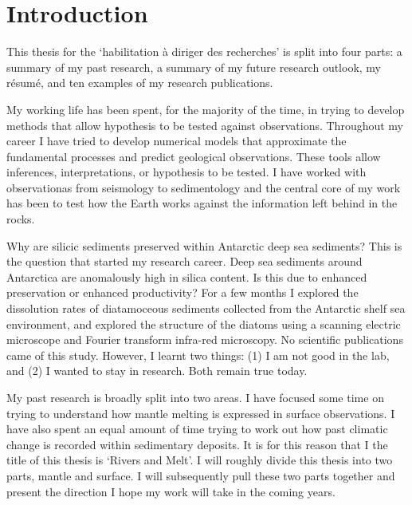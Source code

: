 \chapter{Introduction}

This thesis for the `habilitation à diriger des recherches' is split into four parts: a summary of my past research, a summary of my future research outlook, my résumé, and ten examples of my research publications.

My working life has been spent, for the majority of the time, in trying to develop methods that allow hypothesis to be tested against observations. Throughout my career I have tried to develop numerical models that approximate the fundamental processes and predict geological observations. These tools allow inferences, interpretations, or hypothesis to be tested. I have worked with observationas from seismology to sedimentology and the central core of my work has been to test how the Earth works against the information left behind in the rocks.

Why are silicic sediments preserved within Antarctic deep sea sediments? This is the question that started my research career. Deep sea sediments around Antarctica are anomalously high in silica content. Is this due to enhanced preservation or enhanced productivity? For a few months I explored the dissolution rates of diatamoceous sediments collected from the Antarctic shelf sea environment, and explored the structure of the diatoms using a scanning electric microscope and Fourier transform infra-red microscopy. No scientific publications came of this study. However, I learnt two things: (1) I am not good in the lab, and (2) I wanted to stay in research. Both remain true today.

My past research is broadly split into two areas. I have focused some time on trying to understand how mantle melting is expressed in surface observations. I have also spent an equal amount of time trying to work out how past climatic change is recorded within sedimentary deposits. It is for this reason that I the title of this thesis is `Rivers and Melt'. I will roughly divide this thesis into two parts, mantle and surface. I will subsequently pull these two parts together and present the direction I hope my work will take in the coming years.
